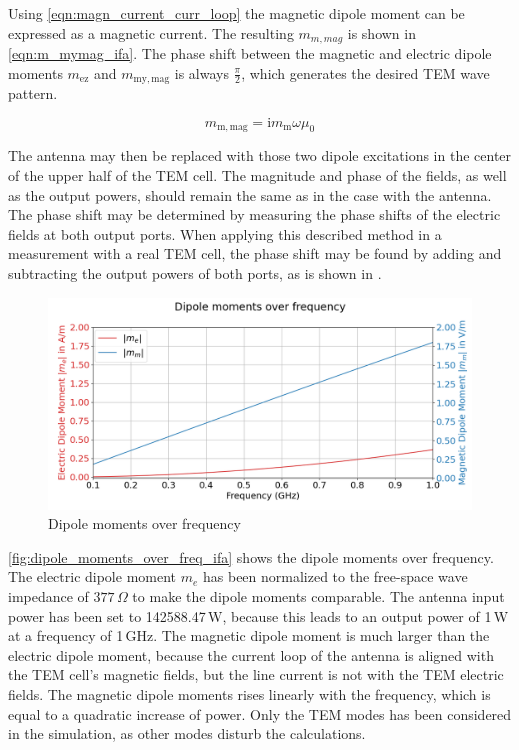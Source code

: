 Using \autoref{eqn:magn_current_curr_loop} the magnetic dipole moment can be expressed as a magnetic current. The resulting $m_{m,mag}$ is shown in \autoref{eqn:m_mymag_ifa}. The phase shift between the magnetic and electric dipole moments $m_{\mathrm{ez}}$ and $m_{\mathrm{my,mag}}$ is always $\frac{\pi}{2}$, which generates the desired TEM wave pattern.

\begin{equation}
    m_{\mathrm{m,mag}}=\mathrm{i}m_{\mathrm{m}}\omega\mu_0
    \label{eqn:m_mymag_ifa}
\end{equation}

The antenna may then be replaced with those two dipole excitations in the center of the upper half of the TEM cell. The magnitude and phase of the fields, as well as the output powers, should remain the same as in the case with the antenna. The phase shift may be determined by measuring the phase shifts of the electric fields at both output ports. When applying this described method in a measurement with a real TEM cell, the phase shift may be found by adding and subtracting the output powers of both ports, as is shown in \cite{Sreenivasiah_Chang_Ma_1981}.

\begin{figure}[h]
    \centering
    \includegraphics[width=1\linewidth]{Documentation/content/30_simulations/img/dipole_moments_over_freq_ifa.png}
    \caption{Dipole moments over frequency}
    \label{fig:dipole_moments_over_freq_ifa}
\end{figure}

\autoref{fig:dipole_moments_over_freq_ifa} shows the dipole moments over frequency. The electric dipole moment $m_e$ has been normalized to the free-space wave impedance of $377\,\Omega$ to make the dipole moments comparable. The antenna input power has been set to 142588.47\,W, because this leads to an output power of 1\,W at a frequency of 1\,GHz. The magnetic dipole moment is much larger than the electric dipole moment, because the current loop of the antenna is aligned with the TEM cell's magnetic fields, but the line current is not with the TEM electric fields. The magnetic dipole moments rises linearly with the frequency, which is equal to a quadratic increase of power. Only the TEM modes has been considered in the simulation, as other modes disturb the calculations. 


